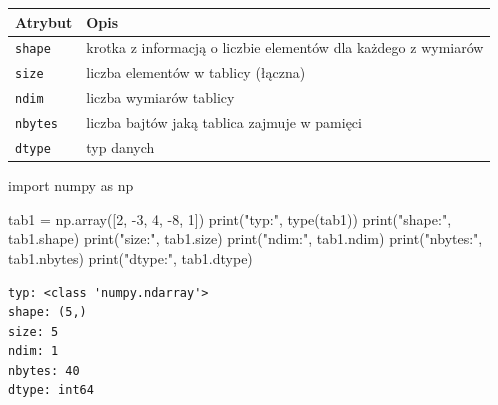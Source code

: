 \documentclass[
  polish,
  letterpaper,
  DIV=11,
  numbers=noendperiod]{scrreprt}
\newenvironment{Shaded}{\begin{snugshade}}{\end{snugshade}}
\newcommand{\BuiltInTok}[1]{\textcolor[rgb]{0.00,0.23,0.31}{#1}}
\newcommand{\DecValTok}[1]{\textcolor[rgb]{0.68,0.00,0.00}{#1}}
\newcommand{\ImportTok}[1]{\textcolor[rgb]{0.00,0.46,0.62}{#1}}
\newcommand{\NormalTok}[1]{\textcolor[rgb]{0.00,0.23,0.31}{#1}}
\newcommand{\OperatorTok}[1]{\textcolor[rgb]{0.37,0.37,0.37}{#1}}
\newcommand{\StringTok}[1]{\textcolor[rgb]{0.13,0.47,0.30}{#1}}
\begin{document}
\begin{longtable}[]{@{}
  >{\raggedright\arraybackslash}p{}
  >{\raggedright\arraybackslash}p{}@{}}
\toprule\noalign{}
\begin{minipage}[b]{\linewidth}\raggedright
Atrybut
\end{minipage} & \begin{minipage}[b]{\linewidth}\raggedright
Opis
\end{minipage} \\
\midrule\noalign{}
\endhead
\bottomrule\noalign{}
\endlastfoot
\texttt{shape} & krotka z informacją o liczbie elementów dla każdego z
wymiarów \\
\texttt{size} & liczba elementów w tablicy (łączna) \\
\texttt{ndim} & liczba wymiarów tablicy \\
\texttt{nbytes} & liczba bajtów jaką tablica zajmuje w pamięci \\
\texttt{dtype} & typ danych \\
\end{longtable}

\begin{Shaded}
\begin{Highlighting}[]
\ImportTok{import}\NormalTok{ numpy }\ImportTok{as}\NormalTok{ np}

\NormalTok{tab1 }\OperatorTok{=}\NormalTok{ np.array([}\DecValTok{2}\NormalTok{, }\OperatorTok{{-}}\DecValTok{3}\NormalTok{, }\DecValTok{4}\NormalTok{, }\OperatorTok{{-}}\DecValTok{8}\NormalTok{, }\DecValTok{1}\NormalTok{])}
\BuiltInTok{print}\NormalTok{(}\StringTok{"typ:"}\NormalTok{, }\BuiltInTok{type}\NormalTok{(tab1))}
\BuiltInTok{print}\NormalTok{(}\StringTok{"shape:"}\NormalTok{, tab1.shape)}
\BuiltInTok{print}\NormalTok{(}\StringTok{"size:"}\NormalTok{, tab1.size)}
\BuiltInTok{print}\NormalTok{(}\StringTok{"ndim:"}\NormalTok{, tab1.ndim)}
\BuiltInTok{print}\NormalTok{(}\StringTok{"nbytes:"}\NormalTok{, tab1.nbytes)}
\BuiltInTok{print}\NormalTok{(}\StringTok{"dtype:"}\NormalTok{, tab1.dtype)}
\end{Highlighting}
\end{Shaded}

\begin{verbatim}
typ: <class 'numpy.ndarray'>
shape: (5,)
size: 5
ndim: 1
nbytes: 40
dtype: int64
\end{verbatim}
\end{document}
